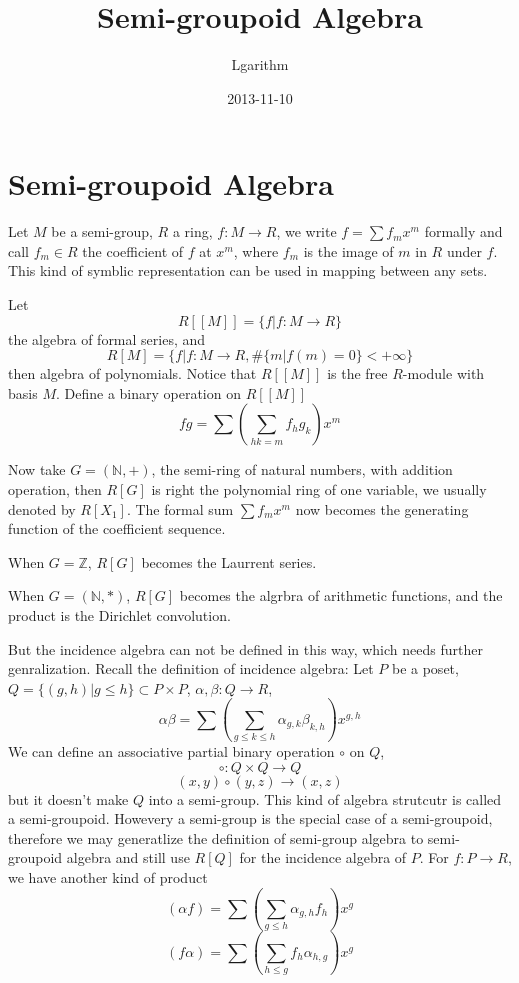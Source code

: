 \documentclass{article}
\title{Semi-groupoid Algebra}
\author{Lgarithm}
\date{2013-11-10}
\begin{document}

\section{Semi-groupoid Algebra}
Let $M$ be a semi-group, $R$ a ring, $f : M \to R$,
we write $f = \sum f_m x^m$ formally and call $f_m \in R$ the coefficient of $f$ at $x^m$,
where $f_m$ is the image of $m$ in $R$ under $f$.
This kind of symblic representation can be used in
mapping between any sets.

Let
$$R[[M]] = \{f \vert f : M \to R\}$$
the algebra of formal series,
and
$$R[M] = \{f \vert f : M \to R, \# \{m \vert f(m) = 0 \} < +\infty \}$$
then algebra of polynomials.
Notice that $R[[M]]$ is the free $R$-module with basis $M$.
Define a binary operation on $R[[M]]$
$$fg = \sum (\sum_{hk = m} f_h g_k) x^m$$

Now take $G = (\mathbb N, +)$, the semi-ring of natural numbers,
with addition operation,
then $R[G]$ is right the polynomial ring of one variable,
we usually denoted by $R[X_1]$.
The formal sum $\sum f_m x^m$ now becomes the generating function of the coefficient sequence.

When $G = \mathbb Z$, $R[G]$ becomes the Laurrent series.

When $G = (\mathbb N, \ast)$, $R[G]$ becomes the algrbra of arithmetic functions,
and the product is the Dirichlet convolution.

But the incidence algebra can not be defined in this way, which needs further genralization.
Recall the definition of incidence algebra:
Let $P$ be a poset, $Q = \{(g, h) \vert g \leq h\} \subset P \times P$,
$\alpha, \beta : Q \to R$,
$$\alpha\beta = \sum (\sum_{g\leq k \leq h} \alpha_{g,k} \beta_{k,h})x^{g,h}$$
We can define an associative partial binary operation $\circ$ on $Q$,
$$\circ : Q \times Q \to Q$$
$$(x, y) \circ (y, z) \to (x, z)$$
but it doesn't make $Q$ into a semi-group.
This kind of algebra strutcutr is called a semi-groupoid.
Howevery a semi-group is the special case of a semi-groupoid,
therefore we may generatlize the definition of semi-group algebra
to semi-groupoid algebra and still use $R[Q]$ for the incidence algebra of $P$.
For $f : P \to R$, we have another kind of product
$$(\alpha f) = \sum (\sum_{g\leq h} \alpha_{g, h} f_h)x^g$$
$$(f \alpha) = \sum (\sum_{h\leq g} f_h \alpha_{h, g})x^g$$
\end{document}

